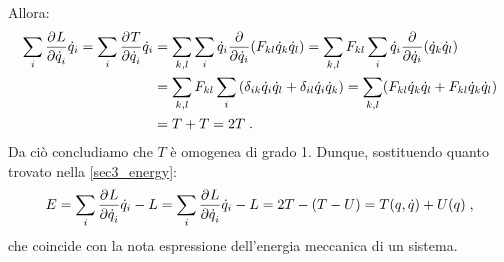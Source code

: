 Allora:
\begin{align}
\sum_i\frac{\partial^{}L}{\partial \dot{q}_i^{}}\dot{q}_i =\sum_i\frac{\partial^{}T}{\partial \dot{q}_i^{}}\dot{q}_i &= \sum_{k,l}\sum_i\dot{q}_i\frac{\partial}{\partial \dot{q}_i}(F_{kl}\dot{q}_k\dot{q}_l)=\sum_{k,l}F_{kl}\sum_i\dot{q}_i\frac{\partial}{\partial \dot{q}_i}(\dot{q}_k\dot{q}_l)\notag \\
&=\sum_{k,l}F_{kl}\sum_i\left(\delta_{ik}\dot{q}_i\dot{q}_l+\delta_{il}\dot{q}_i\dot{q}_k\right)=\sum_{k,l}(F_{kl}\dot{q}_k\dot{q}_l+F_{kl}\dot{q}_k\dot{q}_l) \notag \\
&=T+T=2T\;.
\end{align}
Da ciò concludiamo che $T$ è omogenea di grado 1. Dunque, sostituendo quanto trovato nella \eqref{sec3_energy}:
\begin{equation}
E=\sum_i \frac{\partial^{}L}{\partial \dot{q}_i^{}}\dot{q}_i-L=\sum_i \frac{\partial^{}L}{\partial \dot{q}_i^{}}\dot{q}_i-L=2T-(T-U)=T(q,\dot{q})+U(q)\;,
\end{equation}
che coincide con la nota espressione dell'energia meccanica di un sistema.
